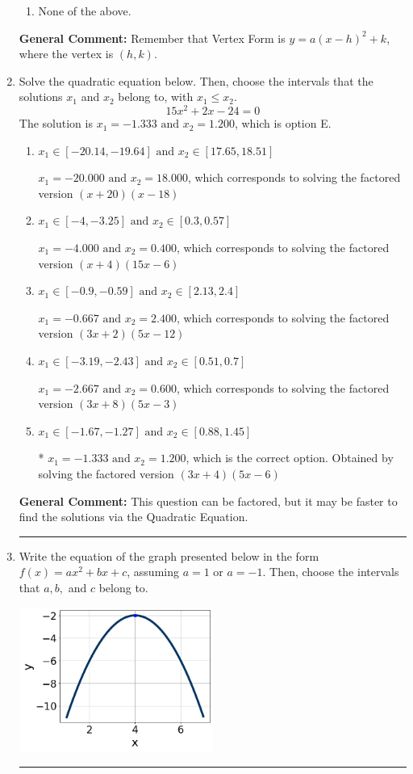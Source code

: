 \documentclass{extbook}[14pt]
\newcommand{\litem}[1]{\item #1

\rule{\textwidth}{0.4pt}}
\begin{document}
\begin{enumerate}
{\begin{enumerate}[label=\Alph*.]
\begin{multicols}{2}
\end{multicols}\item None of the above.\end{enumerate}
\textbf{General Comment:} Remember that Vertex Form is $y = a(x-h)^2+k$, where the vertex is $(h, k)$.
}
\litem{
Solve the quadratic equation below. Then, choose the intervals that the solutions $x_1$ and $x_2$ belong to, with $x_1 \leq x_2$.
\[ 15x^{2} +2 x -24 = 0 \]
The solution is \( x_1 = -1.333 \text{ and } x_2 = 1.200 \), which is option E.\begin{enumerate}[label=\Alph*.]
\item \( x_1 \in [-20.14, -19.64] \text{ and } x_2 \in [17.65, 18.51] \)

$x_1 = -20.000 \text{ and } x_2 = 18.000$, which corresponds to solving the factored version $(x + 20)(x -18)$
\item \( x_1 \in [-4, -3.25] \text{ and } x_2 \in [0.3, 0.57] \)

$x_1 = -4.000 \text{ and } x_2 = 0.400$, which corresponds to solving the factored version $(x + 4)(15x -6)$
\item \( x_1 \in [-0.9, -0.59] \text{ and } x_2 \in [2.13, 2.4] \)

$x_1 = -0.667 \text{ and } x_2 = 2.400$, which corresponds to solving the factored version $(3x + 2)(5x -12)$
\item \( x_1 \in [-3.19, -2.43] \text{ and } x_2 \in [0.51, 0.7] \)

$x_1 = -2.667 \text{ and } x_2 = 0.600$, which corresponds to solving the factored version $(3x + 8)(5x -3)$
\item \( x_1 \in [-1.67, -1.27] \text{ and } x_2 \in [0.88, 1.45] \)

* $x_1 = -1.333 \text{ and } x_2 = 1.200$, which is the correct option. Obtained by solving the factored version $(3x + 4)(5x -6)$
\end{enumerate}

\textbf{General Comment:} This question can be factored, but it may be faster to find the solutions via the Quadratic Equation.
}
\litem{
Write the equation of the graph presented below in the form $f(x)=ax^2+bx+c$, assuming  $a=1$ or $a=-1$. Then, choose the intervals that $a, b,$ and $c$ belong to.

\begin{center}
    \includegraphics[width=0.5\textwidth]{../Figures/quadraticGraphToEquationC.png}
\end{center}



}
\end{enumerate}
\end{document}
